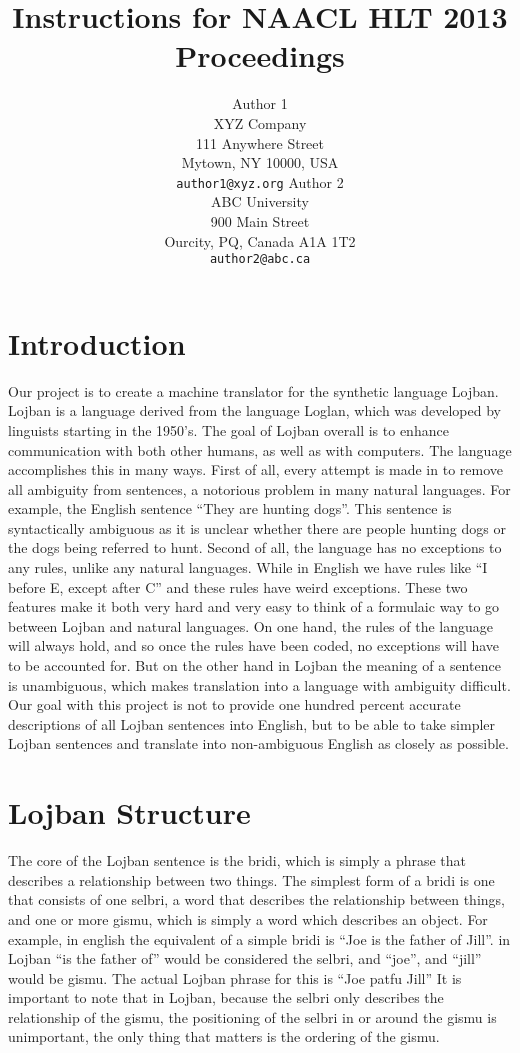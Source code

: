 \documentclass[11pt,letterpaper]{article}
\title{Instructions for NAACL HLT 2013 Proceedings\Thanks{}}
\author{Author 1\\
	    XYZ Company\\
	    111 Anywhere Street\\
	    Mytown, NY 10000, USA\\
	    {\tt author1@xyz.org}
	  \And
	Author 2\\
  	ABC University\\
  	900 Main Street\\
  	Ourcity, PQ, Canada A1A 1T2\\
  {\tt author2@abc.ca}}
\date{}
\begin{document}
\maketitle


\section{Introduction}

	Our project is to create a machine translator for the synthetic language Lojban. Lojban is a language derived from the language Loglan, which was developed by linguists starting in the 1950’s. The goal of Lojban overall is to enhance communication with both other humans, as well as with computers. The language accomplishes this in many ways. First of all, every attempt is made in to remove all ambiguity from sentences, a notorious problem in many natural languages. For example, the English sentence “They are hunting dogs”.  This sentence is syntactically ambiguous as it is unclear whether there are people hunting dogs or the dogs being referred to hunt.  Second of all, the language has no exceptions to any rules, unlike any natural languages. While in English we have rules like “I before E, except after C” and these rules have weird exceptions.  These two features make it both very hard and very easy to think of a formulaic way to go between Lojban and natural languages. On one hand, the rules of the language will always hold, and so once the rules have been coded, no exceptions will have to be accounted for. But on the other hand in Lojban the meaning of a sentence is unambiguous, which makes translation into a language with ambiguity difficult. Our goal with this project is not to provide one hundred percent accurate descriptions of all Lojban sentences into English, but to be able to take simpler Lojban sentences and translate into non-ambiguous English as closely as possible.
\section{Lojban Structure}
	The core of the Lojban sentence is the bridi, which is simply a phrase that describes a relationship between two things. The simplest form of a bridi is one that consists of one selbri, a word that describes the relationship between things, and one or more gismu, which is simply a word which describes an object. For example, in english the equivalent of a simple bridi is “Joe is the father of Jill”. in Lojban “is the father of” would be considered the selbri, and “joe”, and “jill” would be gismu. The actual Lojban phrase for this is “Joe patfu Jill” It is important to note that in Lojban, because the selbri only describes the relationship of the gismu, the positioning of the selbri in or around the gismu is unimportant, the only thing that matters is the ordering of the gismu.
\end{document}
